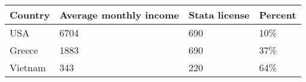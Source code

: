 \begin{table}[!ht]
    \centering
    \begin{tabular}{|l|l|l|l|}
    \hline
        Country & Average monthly income & Stata license & Percent \\ \hline
        USA & 6704 & 690 & 10\% \\ \hline
        Greece & 1883 & 690 & 37\% \\ \hline
        Vietnam & 343 & 220 & 64\% \\ \hline
    \end{tabular}
\end{table}